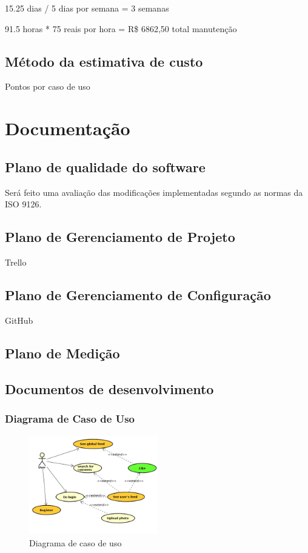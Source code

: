 15.25 dias / 5 dias por semana =  3 semanas

91.5 horas *  75 reais por hora = R\$ 6862,50 total manutenção

\subsection{Método da estimativa de custo}

Pontos por caso de uso

\section{Documentação}

\subsection{Plano de qualidade do software}
	Será feito uma avaliação das modificações implementadas segundo as normas da ISO 9126.
\subsection{Plano de Gerenciamento de Projeto}

Trello

\subsection{Plano de Gerenciamento de Configuração}

GitHub

\subsection{Plano de Medição}

\pagebreak

\subsection{Documentos de desenvolvimento}

\subsubsection{Diagrama de Caso de Uso}

\begin{figure}[ht]
	\centering
	\includegraphics[width=0.5\textwidth]{./imagens/usecase.jpg}
	\caption{Diagrama de caso de uso}
	\label{fig:casoDeUso}
\end{figure}

